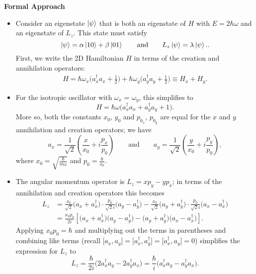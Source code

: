 \documentclass[11pt, a4paper]{article}
\newcommand{\eqtext}[1]{\qquad \text{#1} \qquad}
\begin{document}
\textbf{Formal Approach}
\begin{itemize}
	\item Consider an eigenstate $ \ket{\psi} $ that is both an eigenstate of $ H $ with $ E = 2\hbar \omega $ and an eigenstate of $ L_{z} $. This state must satisfy
	\begin{equation*}
		\ket{\psi} = \alpha \ket{10} + \beta \ket{01} \eqtext{and} L_{z}\ket{\psi} = \lambda \ket{\psi}..
	\end{equation*}
	First, we write the 2D Hamiltonian $ H $ in terms of the creation and annihilation operators:
	\begin{align*}
		H = \hbar \omega_{x}\big(a_{x}^{\dagger}a_{x} + \tfrac{1}{2}\big) + \hbar \omega_{y}\big(a_{y}^{\dagger}a_{y} + \tfrac{1}{2}\big) \equiv H_{x} + H_{y}.
	\end{align*}

	\item For the isotropic oscillator with $ \omega_{x} $ = $ \omega_{y} $, this simplifies to
	\begin{equation*}
		H = \hbar \omega \big(a_{x}^{\dagger}a_{x} + a_{y}^{\dagger}a_{y} + 1\big).
	\end{equation*}
	More so, both the constants $ x_{0} $, $ y_{0} $ and $ p_{0_{x}} $, $ p_{0_{y}} $ are equal for the $ x $ and $ y $ annihilation and creation operators; we have
	\begin{equation*}
		a_{x} = \frac{1}{\sqrt{2}}\left(\frac{x}{x_{0}} + i\frac{p_{x}}{p_{0}}\right) \eqtext{and} a_{y} = \frac{1}{\sqrt{2}}\left(\frac{y}{x_{0}} + i\frac{p_{y}}{p_{0}}\right),
	\end{equation*}
	where $ x_{0} = \sqrt{\frac{\hbar}{m \omega}} $ and $ p_{0} = \frac{\hbar}{x_{0}} $.
	
	\item The angular momentum operator is $ L_{z} = x p_{y} - y p_{x} $; in terms of the annihilation and creation operators this becomes
	\begin{align*}
		L_{z} &= \frac{x_{0}}{\sqrt{2}}\big(a_{x} + a_{x}^{\dagger}\big)\cdot \frac{p_{0}}{\sqrt{2}i}\big(a_{y} - a_{y}^{\dagger}\big) - \frac{x_{0}}{\sqrt{2}}\big(a_{y} + a_{y}^{\dagger}\big)\cdot \frac{p_{0}}{\sqrt{2}i}\big(a_{x} - a_{x}^{\dagger}\big)\\
		&=\frac{x_{0}p_{0}}{2i}\left[\big(a_{x}+a_{x}^{\dagger}\big)\big(a_{y}-a_{y}^{\dagger}\big) - \big(a_{y}+a_{y}^{\dagger}\big)\big(a_{x}-a_{x}^{\dagger}\big)\right].
	\end{align*}
	Applying $ x_{0}p_{0} = \hbar $ and multiplying out the terms in parentheses and combining like terms (recall $ \big[a_{x}, a_{y}\big] = \big[a_{x}^{\dagger}, a_{y}^{\dagger}\big] =  \big[a_{x}^{\dagger}, a_{y}\big] = 0$) simplifies the expression for $ L_{z} $  to
	\begin{equation*}
		L_{z} = \frac{\hbar}{2i}\big(2a_{x}^{\dagger}a_{y} - 2a_{y}^{\dagger}a_{x}\big) = \frac{\hbar}{i}\big(a_{x}^{\dagger}a_{y} - a_{y}^{\dagger}a_{x}\big).
	\end{equation*}
	

\end{itemize}
\end{document}
